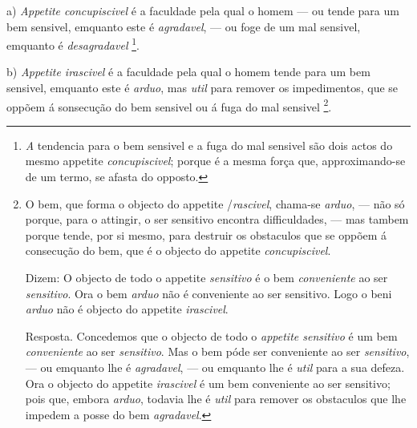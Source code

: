 a) \emph{Appetite concupiscivel} é a faculdade pela qual o homem --- ou tende para um bem sensivel, emquanto este é \emph{agradavel}, --- ou foge de um mal sensivel, emquanto é \emph{desagradavel} \footnote{\emph{A} tendencia para o bem sensivel e a fuga do mal sensivel são dois actos do mesmo appetite \emph{concupiscivel}; porque é a mesma força que, approximando-se de um termo, se afasta do opposto.}.

b) \emph{Appetite irascivel} é a faculdade pela qual o homem tende para um bem sensivel, emquanto este é \emph{arduo}, mas \emph{util} para remover os impedimentos, que se oppõem á sonsecução do bem sensivel ou á fuga do mal sensivel \footnote{O bem, que forma o objecto do appetite /\emph{rascivel}, chama-se \emph{arduo}, --- não só porque, para o attingir, o ser sensitivo encontra difficuldades, --- mas tambem porque tende, por si mesmo, para destruir os obstaculos que se oppõem á consecução do bem, que é o objecto do appetite \emph{concupiscivel}.\par Dizem: O objecto de todo o appetite \emph{sensitivo} é o bem \emph{conveniente} ao ser \emph{sensitivo}. Ora o bem \emph{arduo} não é conveniente ao ser sensitivo. Logo o beni \emph{arduo} não é objecto do appetite \emph{irascivel}.\par Resposta. Concedemos que o objecto de todo o \emph{appetite sensitivo} é um bem \emph{conveniente} ao ser \emph{sensitivo}. Mas o bem póde ser conveniente ao ser \emph{sensitivo}, --- ou emquanto lhe é \emph{agradavel}, --- ou emquanto lhe é \emph{util} para a sua defeza. Ora o objecto do appetite \emph{irascivel} é um bem conveniente ao ser sensitivo; pois que, embora \emph{arduo}, todavia lhe é \emph{util} para remover os obstaculos que lhe impedem a posse do bem \emph{agradavel}.}.

